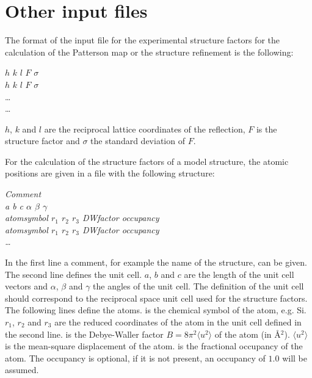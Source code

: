 \documentclass[a4paper]{article}
\begin{document}
\section{Other input files}
The format of the input file for the experimental structure factors for the calculation of the Patterson map or the structure refinement is the following:
\begin{filestruc}
$h$ $k$ $l$ $F$ $\sigma$ \\
$h$ $k$ $l$ $F$ $\sigma$ \\
\ldots \\
\ldots \\
\end{filestruc}
$h$, $k$ and $l$ are the reciprocal lattice coordinates of the reflection, $F$ is the structure factor and $\sigma$ the standard deviation of $F$.

For the calculation of the structure factors of a model structure, the
atomic positions are given in a file with the following structure: 
\begin{filestruc}
\em Comment \\
a b c $\alpha$ $\beta$ $\gamma$ \\
atomsymbol $r_1$ $r_2$ $r_3$ DWfactor occupancy \\
atomsymbol $r_1$ $r_2$ $r_3$ DWfactor occupancy \\
\ldots \\
\end{filestruc}
In the first line a comment, for example the name of the structure,
can be given. The second line defines the unit cell. $a$, $b$ and $c$
are the length of the unit cell vectors and $\alpha$, $\beta$ and
$\gamma$ the angles of the unit cell. The definition of the unit cell
should correspond to the reciprocal space unit cell used for the
structure factors. The following lines define the atoms.  is the chemical symbol of the atom, e.g. Si. 
$r_1$, $r_2$ and $r_3$ are the reduced coordinates of the atom in the
unit cell defined in the second line.  is the
Debye-Waller factor $ B=8\pi^2\langle u^2\rangle$ of the atom (in
\AA$^2$). $\langle u^2\rangle$ is the mean-square displacement of
the atom.  is the
fractional occupancy of the atom. The occupancy  is optional, if it is not present, an occupancy of $1.0$ will be assumed.
\end{document}
